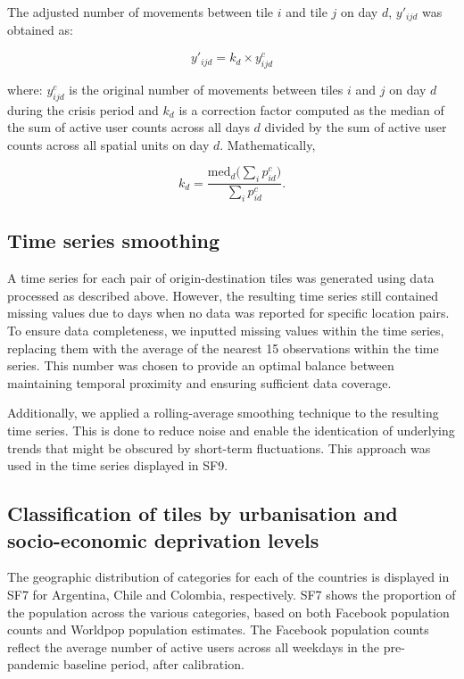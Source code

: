 \documentclass[fleqn,10pt]{wlscirep}
\begin{document}
The adjusted number of movements between tile $i$ and tile $j$ on day $d$, $y'_{ijd}$ was obtained as:

\begin{equation}
y'_{ijd} = k_d \times y^c_{ijd}
\end{equation}

where: $y^c_{ijd}$ is the original number of movements between tiles $i$ and $j$ on day $d$ during the crisis period and $k_d$ is a correction factor computed as the median of the sum of active user counts across all days $d$ divided by the sum of active user counts across all spatial units on day $d$. Mathematically,

\begin{equation}
k_d = \dfrac{\mbox{med}_d\big(\sum_i{p^c_{id}}\big)}{\sum_i{p^c_{id}}}.
\end{equation}

\subsection*{Time series smoothing}

A time series for each pair of origin-destination tiles was generated using data processed as described above.
However, the resulting time series still contained missing values due to days when no data was reported for specific location pairs.
To ensure data completeness, we inputted missing values within the time series, replacing them with the average of the nearest 15 observations within the time series.
This number was chosen to provide an optimal balance between maintaining temporal proximity and ensuring sufficient data coverage.

Additionally, we applied a rolling-average smoothing technique to the resulting time series. This is done to reduce noise and enable the identication of underlying trends that might be obscured by short-term fluctuations.
This approach was used in the time series displayed in SF9.

\subsection*{Classification of tiles by urbanisation and socio-economic deprivation levels}

The geographic distribution of categories for each of the countries is displayed in SF7 for Argentina, Chile and Colombia,
respectively. SF7 shows the proportion of the population across the various categories, based on both Facebook population counts and Worldpop population estimates. The Facebook population counts reflect the average number of active users across all weekdays in the pre-pandemic baseline period, after calibration.
\end{document}

